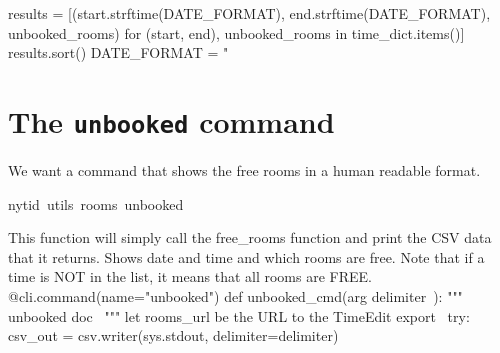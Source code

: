 results = [(start.strftime(DATE_FORMAT),
            end.strftime(DATE_FORMAT),
            unbooked_rooms)
           for (start, end), unbooked_rooms in time_dict.items()]
results.sort()
\nwendcode{}\plusendmoddef\nwstartdeflinemarkup{}\nwenddeflinemarkup
DATE_FORMAT = "%
\nwendcode{}\nwdocspar



\section{The \texttt{unbooked} command}

We want a command that shows the free rooms in a human readable format.
\begin{center}
{\Tt{}nytid\ utils\ rooms\ unbooked\nwendquote}
\end{center}
This function will simply call the {\Tt{}free{\_}rooms\nwendquote} function and print the CSV 
data that it returns.
\nwenddocs{}\endmoddef\nwstartdeflinemarkup{}\nwenddeflinemarkup
Shows date and time and which rooms are free. Note that if a time is NOT in the 
list, it means that all rooms are FREE.
\nwendcode{}\plusendmoddef\nwstartdeflinemarkup{}\nwenddeflinemarkup
@cli.command(name="unbooked")
def unbooked_cmd(\LA{}arg \code{}delimiter\edoc{}~{\nwtagstyle{}}\RA{}):
  """
  \LA{}\code{}unbooked\edoc{} doc~{\nwtagstyle{}}\RA{}
  """
  \LA{}let \code{}rooms{\_}url\edoc{} be the URL to the TimeEdit export~{\nwtagstyle{}}\RA{}
  try:
    csv_out = csv.writer(sys.stdout, delimiter=delimiter)

